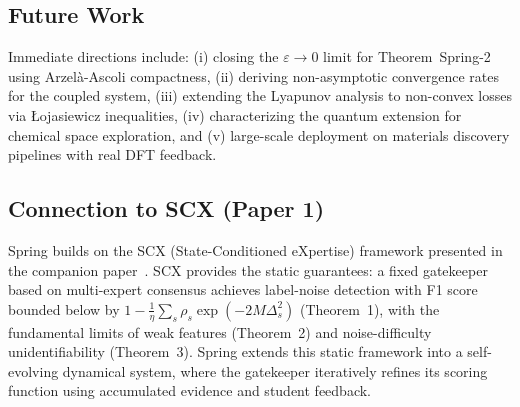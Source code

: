 \documentclass[11pt,a4paper]{article}
\theoremstyle{plain}
\theoremstyle{definition}
\theoremstyle{remark}
\begin{document}
\subsection{Future Work}

Immediate directions include: (i) closing the $\varepsilon \to 0$ limit for Theorem~Spring-2 using Arzel\`{a}-Ascoli compactness, (ii) deriving non-asymptotic convergence rates for the coupled system, (iii) extending the Lyapunov analysis to non-convex losses via {\L}ojasiewicz inequalities, (iv) characterizing the quantum extension for chemical space exploration, and (v) large-scale deployment on materials discovery pipelines with real DFT feedback.

\subsection{Connection to SCX (Paper 1)}

Spring builds on the SCX (State-Conditioned eXpertise) framework presented in the companion paper~\citep{scx2026}. SCX provides the static guarantees: a fixed gatekeeper based on multi-expert consensus achieves label-noise detection with F1 score bounded below by $1 - \frac{1}{\eta}\sum_s \rho_s \exp(-2M\Delta_s^2)$ (Theorem~1), with the fundamental limits of weak features (Theorem~2) and noise-difficulty unidentifiability (Theorem~3). Spring extends this static framework into a self-evolving dynamical system, where the gatekeeper iteratively refines its scoring function using accumulated evidence and student feedback.
\end{document}
